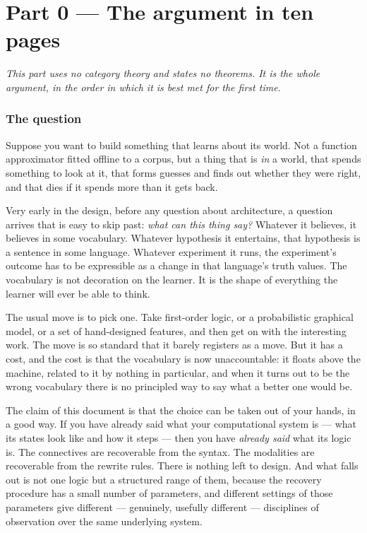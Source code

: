 \part*{Part 0 --- The argument in ten pages}
\setcounter{section}{0}
\renewcommand{\thesection}{0.\arabic{section}}

\bigskip
\noindent
\emph{This part uses no category theory and states no theorems. It is the whole
argument, in the order in which it is best met for the first time.}
\bigskip

\section{The question}
\label{sec:0question}

Suppose you want to build something that learns about its world. Not a function
approximator fitted offline to a corpus, but a thing that is \emph{in} a world,
that spends something to look at it, that forms guesses and finds out whether
they were right, and that dies if it spends more than it gets back.

Very early in the design, before any question about architecture, a question
arrives that is easy to skip past: \emph{what can this thing say?} Whatever it
believes, it believes in some vocabulary. Whatever hypothesis it entertains, that
hypothesis is a sentence in some language. Whatever experiment it runs, the
experiment's outcome has to be expressible as a change in that language's truth
values. The vocabulary is not decoration on the learner. It is the shape of
everything the learner will ever be able to think.

The usual move is to pick one. Take first-order logic, or a probabilistic graphical
model, or a set of hand-designed features, and then get on with the interesting
work. The move is so standard that it barely registers as a move. But it has a
cost, and the cost is that the vocabulary is now unaccountable: it floats above the
machine, related to it by nothing in particular, and when it turns out to be the
wrong vocabulary there is no principled way to say what a better one would be.

The claim of this document is that the choice can be taken out of your hands, in a
good way. If you have already said what your computational system is --- what its
states look like and how it steps --- then you have \emph{already said} what its
logic is. The connectives are recoverable from the syntax. The modalities are
recoverable from the rewrite rules. There is nothing left to design. And what
falls out is not one logic but a structured range of them, because the recovery
procedure has a small number of parameters, and different settings of those
parameters give different --- genuinely, usefully different --- disciplines of
observation over the same underlying system.

